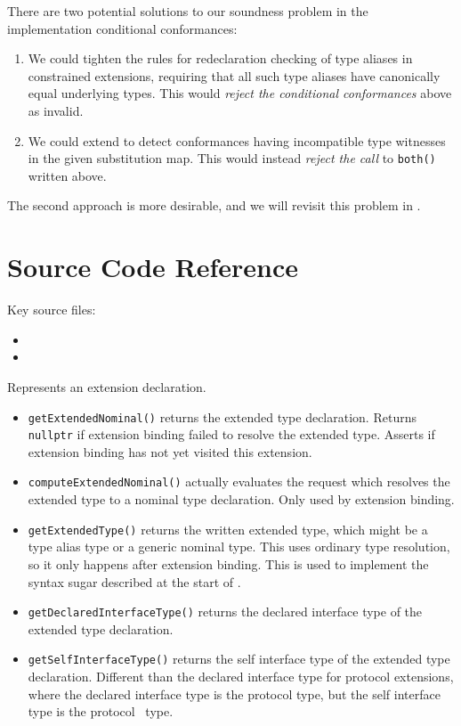 \documentclass[../generics]{subfiles}
\begin{document}
There are two potential solutions to our soundness problem in the implementation conditional conformances:
\begin{enumerate}
\item We could tighten the rules for redeclaration checking of type aliases in constrained extensions, requiring that all such type aliases have canonically equal underlying types. This would \textsl{reject the conditional conformances} above as invalid.
\item We could extend  to detect conformances having incompatible type witnesses in the given substitution map. This would instead \textsl{reject the call} to \texttt{both()} written above.
\end{enumerate}
The second approach is more desirable, and we will revisit this problem in .

\section{Source Code Reference}\label{src:extensions}

Key source files:
\begin{itemize}
\item {}
\item {}
\end{itemize}

Represents an extension declaration.
\begin{itemize}
\item \texttt{getExtendedNominal()} returns the extended type declaration. Returns \verb|nullptr| if extension binding failed to resolve the extended type. Asserts if extension binding has not yet visited this extension.
\item \texttt{computeExtendedNominal()} actually evaluates the request which resolves the extended type to a nominal type declaration. Only used by extension binding.
\item \texttt{getExtendedType()} returns the written extended type, which might be a type alias type or a generic nominal type. This uses ordinary type resolution, so it only happens after extension binding. This is used to implement the syntax sugar described at the start of .
\item \texttt{getDeclaredInterfaceType()} returns the declared interface type of the extended type declaration.
\item \texttt{getSelfInterfaceType()} returns the self interface type of the extended type declaration. Different than the declared interface type for protocol extensions, where the declared interface type is the protocol type, but the self interface type is the protocol \tSelf\ type.
\end{itemize}
\end{document}
